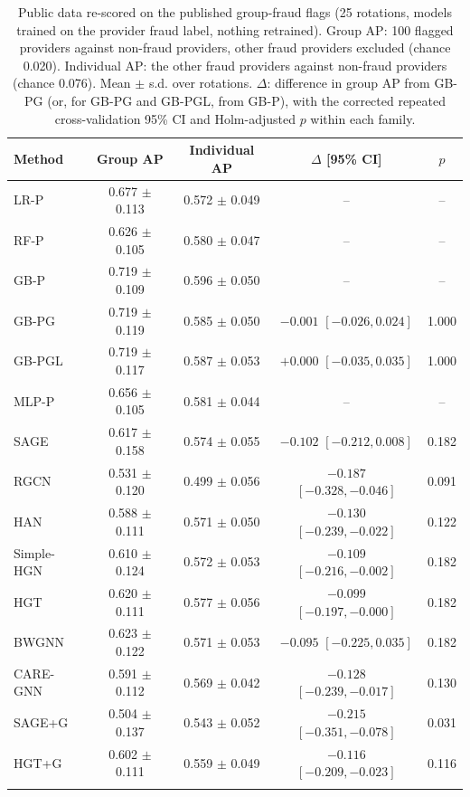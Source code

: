 \begin{table}[h]
\caption{Public data re-scored on the published group-fraud flags (25 rotations, models trained on the provider fraud label, nothing retrained). Group AP: 100 flagged providers against non-fraud providers, other fraud providers excluded (chance 0.020). Individual AP: the other fraud providers against non-fraud providers (chance 0.076). Mean $\pm$ s.d. over rotations. $\Delta$: difference in group AP from GB-PG (or, for GB-PG and GB-PGL, from GB-P), with the corrected repeated cross-validation 95\% CI and Holm-adjusted $p$ within each family.}\label{tab:grouplabels}
\scriptsize
\begin{tabular}{@{}lcccc@{}}
\toprule
Method & Group AP & Individual AP & $\Delta$ [95\% CI] & $p$ \\
\midrule
LR-P & 0.677 $\pm$ 0.113 & 0.572 $\pm$ 0.049 & -- & -- \\
RF-P & 0.626 $\pm$ 0.105 & 0.580 $\pm$ 0.047 & -- & -- \\
GB-P & 0.719 $\pm$ 0.109 & 0.596 $\pm$ 0.050 & -- & -- \\
GB-PG & 0.719 $\pm$ 0.119 & 0.585 $\pm$ 0.050 & $-0.001$ $[-0.026, 0.024]$ & 1.000 \\
GB-PGL & 0.719 $\pm$ 0.117 & 0.587 $\pm$ 0.053 & $+0.000$ $[-0.035, 0.035]$ & 1.000 \\
MLP-P & 0.656 $\pm$ 0.105 & 0.581 $\pm$ 0.044 & -- & -- \\
SAGE & 0.617 $\pm$ 0.158 & 0.574 $\pm$ 0.055 & $-0.102$ $[-0.212, 0.008]$ & 0.182 \\
RGCN & 0.531 $\pm$ 0.120 & 0.499 $\pm$ 0.056 & $-0.187$ $[-0.328, -0.046]$ & 0.091 \\
HAN & 0.588 $\pm$ 0.111 & 0.571 $\pm$ 0.050 & $-0.130$ $[-0.239, -0.022]$ & 0.122 \\
Simple-HGN & 0.610 $\pm$ 0.124 & 0.572 $\pm$ 0.053 & $-0.109$ $[-0.216, -0.002]$ & 0.182 \\
HGT & 0.620 $\pm$ 0.111 & 0.577 $\pm$ 0.056 & $-0.099$ $[-0.197, -0.000]$ & 0.182 \\
BWGNN & 0.623 $\pm$ 0.122 & 0.571 $\pm$ 0.053 & $-0.095$ $[-0.225, 0.035]$ & 0.182 \\
CARE-GNN & 0.591 $\pm$ 0.112 & 0.569 $\pm$ 0.042 & $-0.128$ $[-0.239, -0.017]$ & 0.130 \\
SAGE+G & 0.504 $\pm$ 0.137 & 0.543 $\pm$ 0.052 & $-0.215$ $[-0.351, -0.078]$ & 0.031 \\
HGT+G & 0.602 $\pm$ 0.111 & 0.559 $\pm$ 0.049 & $-0.116$ $[-0.209, -0.023]$ & 0.116 \\
\botrule
\end{tabular}
\end{table}